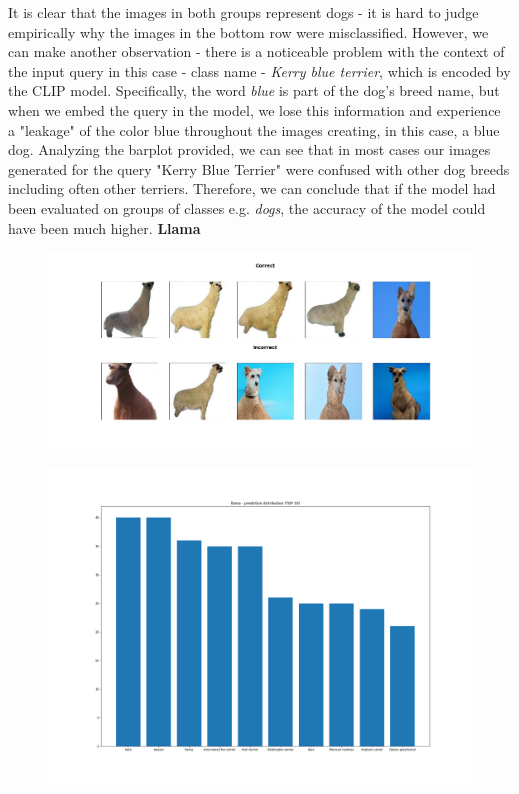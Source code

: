\documentclass[12pt,a4paper,openany]{book}
\begin{document}
\newline
\noindent It is clear that the images in both groups represent dogs - it is hard to judge empirically why the images in the bottom row were misclassified. However, we can make another observation - there is a noticeable problem with the context of the input query in this case - class name - \textit{Kerry blue terrier}, which is encoded by the CLIP model. Specifically, the word \textit{blue} is part of the dog's breed name, but when we embed the query in the model, we lose this information and experience a "leakage" of the color blue throughout the images creating, in this case, a blue dog.  Analyzing the barplot provided, we can see that in most cases our images generated for the query "Kerry Blue Terrier" were confused with other dog breeds including often other terriers. Therefore, we can conclude that if the model had been evaluated on groups of classes e.g. \textit{dogs}, the accuracy of the model could have been much higher.
\newline
\noindent \textbf{Llama} \\
\begin{figure}[ht!]
    \centering
    \includegraphics[scale=0.4]{figs/imagenet_examples/llama.png}
\end{figure}
\begin{figure}[ht!]
    \centering
    \includegraphics[scale=0.3]{figs/imagenet_examples/llama_imagenet_dist.png}
\end{figure}
\end{document}
